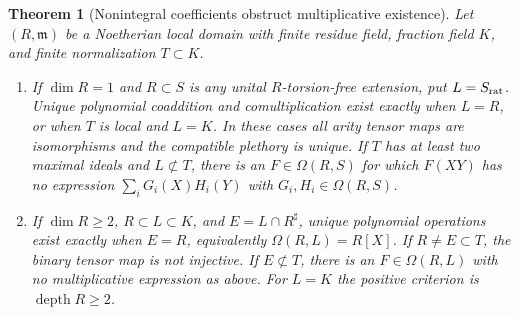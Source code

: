 \documentclass[11pt,a4paper]{article}
\newtheorem{theorem}{Theorem}[section]
\theoremstyle{definition}
\begin{document}
\begin{theorem}[Nonintegral coefficients obstruct multiplicative existence]\label{result-55}
Let $(R,\mathfrak m)$ be a Noetherian local domain with finite residue
field, fraction field $K$, and finite normalization $T\subset K$.
\begin{enumerate}
\item If $\dim R=1$ and $R\subset S$ is any unital $R$-torsion-free
extension, put $L=S_{\rm rat}$. Unique polynomial coaddition and
comultiplication exist exactly when
$L=R$, or when $T$ is local and $L=K$. In these cases all arity
tensor maps are isomorphisms and the compatible plethory is unique.
If $T$ has at least two maximal ideals and $L\not\subset T$, there
is an $F\in\Omega(R,S)$ for which $F(XY)$ has no expression
$\sum_iG_i(X)H_i(Y)$ with $G_i,H_i\in\Omega(R,S)$.
\item If $\dim R\ge2$, $R\subset L\subset K$, and
$E=L\cap R^\sharp$, unique polynomial operations exist exactly when
$E=R$, equivalently $\Omega(R,L)=R[X]$. If $R\ne E\subset T$,
the binary tensor map is not injective. If $E\not\subset T$, there
is an $F\in\Omega(R,L)$ with no multiplicative expression as above.
For $L=K$ the positive criterion is $\operatorname{depth}R\ge2$.
\end{enumerate}
\end{theorem}
\end{document}
